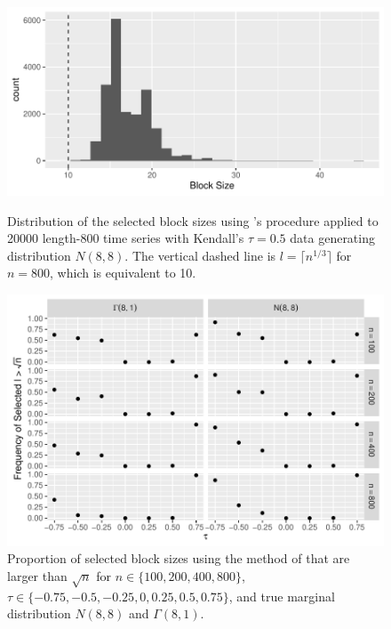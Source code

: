 \documentclass[12pt]{article}
\begin{document}
\begin{figure}[tbp]
  \centering
  \includegraphics[scale=1]{figures/block_dist}
  \caption{Distribution of the selected block sizes using
  \citet{politis2004automatic}'s procedure applied to 20000 length-800 time 
  series with
    Kendall's $\tau = 0.5$ data generating distribution $N(8,8)$. The vertical
    dashed line is $l = \lceil n^{1/3} \rceil$ for $n = 800$, which is equivalent 
    to 10.
  }
  \label{fig:block_dist}


  \centering
  \includegraphics[scale=1]{figures/large_block}
  \caption{Proportion of selected block sizes using the method of
  \citet{politis2004automatic} that are larger than
    $\sqrt{n}$ for $n \in \{100, 200, 400, 800\}$,
    $\tau \in \{-0.75, -0.5, -0.25, 0, 0.25, 0.5, 0.75\}$, and true marginal distribution
    $N(8,8)$ and $\Gamma(8,1)$.
  }
  \label{fig:large_block}
\end{figure}
\end{document}
